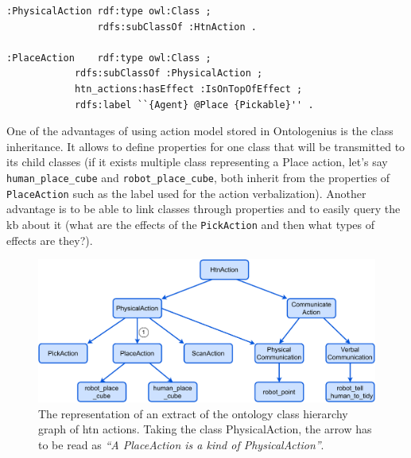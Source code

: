 \documentclass[a4paper,11pt,twoside]{StyleThese}
\begin{document}
\begin{lstlisting}[style=OwlTurtle, label={chap2:lst:classes}, caption={Description of ontology classes in the OWL language using the Turtle syntax.} ]
:PhysicalAction	rdf:type owl:Class ;
				rdfs:subClassOf :HtnAction .

:PlaceAction	rdf:type owl:Class ;
			rdfs:subClassOf :PhysicalAction ;
			htn_actions:hasEffect :IsOnTopOfEffect ;
			rdfs:label ``{Agent} @Place {Pickable}'' .

\end{lstlisting}

One of the advantages of using action model stored in Ontologenius is the class inheritance. It allows to define properties for one class that will be transmitted to its child classes (\eg if it exists multiple class representing a Place action, let's say \verb'human_place_cube' and \verb'robot_place_cube', both inherit from the properties of \verb'PlaceAction' such as the label used for the action verbalization). Another advantage is to be able to link classes through properties and to easily query the \acrshort{kb} about it (\eg what are the effects of the \verb'PickAction' and then what types of effects are they?).

\begin{figure}[!ht]
	\includegraphics[width=\linewidth]{figures/chapter2/class_actions.pdf}
	\caption{The representation of an extract of the ontology class hierarchy graph of \acrshort{htn} actions. Taking the class PhysicalAction, the arrow  has to be read	as \textit{``A PlaceAction is a kind of PhysicalAction''}.}
	\label{chap6:fig:class_actions}
\end{figure}
\end{document}
